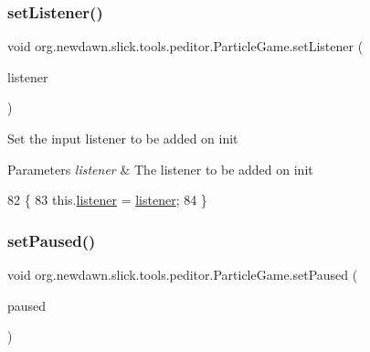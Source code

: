 \subsubsection{\texorpdfstring{set\+Listener()}{setListener()}}
{\footnotesize\ttfamily void org.\+newdawn.\+slick.\+tools.\+peditor.\+Particle\+Game.\+set\+Listener (\begin{DoxyParamCaption}\item[{\mbox{\hyperlink{interfaceorg_1_1newdawn_1_1slick_1_1_input_listener}{Input\+Listener}}}]{listener }\end{DoxyParamCaption})\hspace{0.3cm}{\ttfamily [inline]}}

Set the input listener to be added on init


\begin{DoxyParams}{Parameters}
{\em listener} & The listener to be added on init \\
\hline
\end{DoxyParams}

\begin{DoxyCode}
82                                                     \{
83         this.\mbox{\hyperlink{classorg_1_1newdawn_1_1slick_1_1tools_1_1peditor_1_1_particle_game_a53d1d501b82579d73d73b49f5a793b84}{listener}} = \mbox{\hyperlink{classorg_1_1newdawn_1_1slick_1_1tools_1_1peditor_1_1_particle_game_a53d1d501b82579d73d73b49f5a793b84}{listener}};
84     \}
\end{DoxyCode}
\mbox{\label{classorg_1_1newdawn_1_1slick_1_1tools_1_1peditor_1_1_particle_game_a4f57bbbd2865e3b9571ffc3f2b4ac46e}} 
\subsubsection{\texorpdfstring{set\+Paused()}{setPaused()}}
{\footnotesize\ttfamily void org.\+newdawn.\+slick.\+tools.\+peditor.\+Particle\+Game.\+set\+Paused (\begin{DoxyParamCaption}\item[{boolean}]{paused }\end{DoxyParamCaption})\hspace{0.3cm}{\ttfamily [inline]}}

